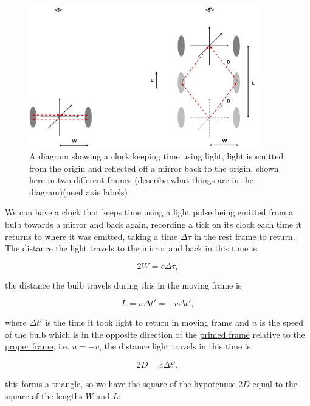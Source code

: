 \begin{figure}[ht]
	\centering
	\includegraphics[width=10cm]{images/pdf/Light_clock.pdf}
	\caption{A diagram showing a clock keeping time using light, light is emitted from the origin and reflected off a mirror back to the origin, shown here in two different frames (describe what things are in the diagram)(need axis labels)}
	\label{fig: light clock}
\end{figure}

We can have a clock that keeps time using a light pulse being emitted from a bulb towards a mirror and back again, recording a tick on its clock each time it returns to where it was emitted, taking a time $\Delta \tau$ in the rest frame to return. The distance the light travels to the mirror and back in this time is

\begin{equation}
	2W=c\Delta \tau,
\end{equation}

the distance the bulb travels during this in the moving frame is

\begin{equation}
	L=u\Delta t' = -v \Delta t',
\end{equation}

where $\Delta t'$ is the time it took light to return in moving frame and $u$ is the speed of the bulb which is in the opposite direction of the \hyperlink{def-Primed-Frame}{primed frame} relative to the \hyperlink{def-proper-frame}{proper frame}, i.e. $u=-v$, the distance light travels in this time is

\begin{equation}
	2D = c \Delta t{'},
\end{equation}

this forms a triangle, so we have the square of the hypotenuse $2D$ equal to the square of the lengths $W$ and $L$:

